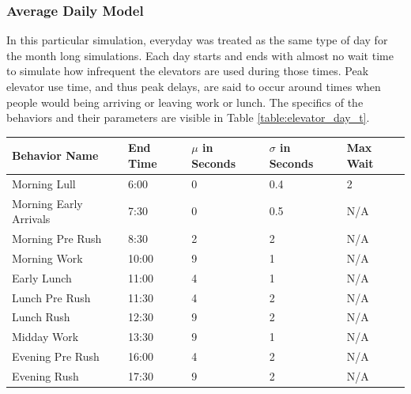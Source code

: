   \subsubsection{ Average Daily Model}
  In this particular simulation, everyday was treated as the same type of day
  for the month long simulations. Each day starts and ends with almost no wait
  time to simulate how infrequent the elevators are used during those times.
  Peak elevator use time, and thus peak delays, are said to occur around times
  when people would being arriving or leaving work or lunch. The specifics of
  the behaviors and their parameters are visible in Table
  \ref{table:elevator_day_t}.

  \begin{table}[!htb]
    \begin{tabular}{|l|l|l|l|l|}
      \hline
      Behavior Name          & End Time & $\mu$ in Seconds & $\sigma$ in Seconds & Max Wait \\ \hline
      Morning Lull           & 6:00     & 0                                 & 0.4                           & 2        \\ \hline
      Morning Early Arrivals & 7:30     & 0                                 & 0.5                           & N/A      \\ \hline
      Morning Pre Rush       & 8:30     & 2                                 & 2                             & N/A      \\ \hline
      Morning Work           & 10:00    & 9                                 & 1                             & N/A      \\ \hline
      Early Lunch            & 11:00    & 4                                 & 1                             & N/A      \\ \hline
      Lunch Pre Rush         & 11:30    & 4                                 & 2                             & N/A      \\ \hline
      Lunch Rush             & 12:30    & 9                                 & 2                             & N/A      \\ \hline
      Midday Work            & 13:30    & 9                                 & 1                             & N/A      \\ \hline
      Evening Pre Rush       & 16:00    & 4                                 & 2                             & N/A      \\ \hline
      Evening Rush           & 17:30    & 9                                 & 2                             & N/A      \\ \hline

\end{tabular}
\end{table}
